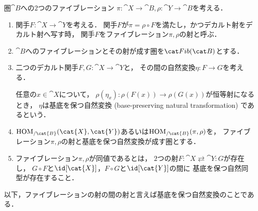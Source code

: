     \begin{Def}[ファイブレーションの射]
        圏$\cat{B}$への$2$つのファイブレーション
        $\pi \colon \cat{X} \to \cat{B}, \rho \colon \cat{Y} \to \cat{B}$を考える．
        
    \begin{enumerate}
        \item
            関手$F \colon \cat{X} \to \cat{Y}$を考える．
            関手$F$が$\pi=\rho \circ F$を満たし，かつデカルト射をデカルト射へ写す時，
            関手$F$をファイブレーション$\pi, \rho$の射と呼ぶ．

        \item
            $\cat{B}$へのファイブレーションとその射が成す圏を$\Fib{B}$とする．

        \item
            二つのデカルト関手$F,G \colon \cat{X} \to \cat{Y}$と，
            その間の自然変換$\eta \colon F \to G$を考える．
            \begin{center}
            \end{center}
            任意の$x \in \cat{X}$について，
            $\rho(\eta_x) \colon \rho(F(x)) \to \rho(G(x))$が恒等射になるとき，
            $\eta$は基底を保つ自然変換 (base-preserving natural transformation) であるという．

        \item
            $\HOM_{/\cat{B}}(\cat{X}, \cat{Y})$あるいは$\HOM_{/\cat{B}}(\pi, \rho)$を，
            ファイブレーション$\pi, \rho$の射と基底を保つ自然変換が成す圏とする．

        \item
            ファイブレーション$\pi, \rho$が同値であるとは，
            $2$つの射$F \colon \cat{X} \rightleftarrows \cat{Y} \colon G$が存在し，
            $G \circ F$と$\id[\cat{X}]$，$F \circ G$と$\id[\cat{Y}]$の間に
            基底を保つ自然同型が存在すること．
    \end{enumerate}
    \end{Def}
    以下，ファイブレーションの射の間の射と言えば基底を保つ自然変換のことである．

